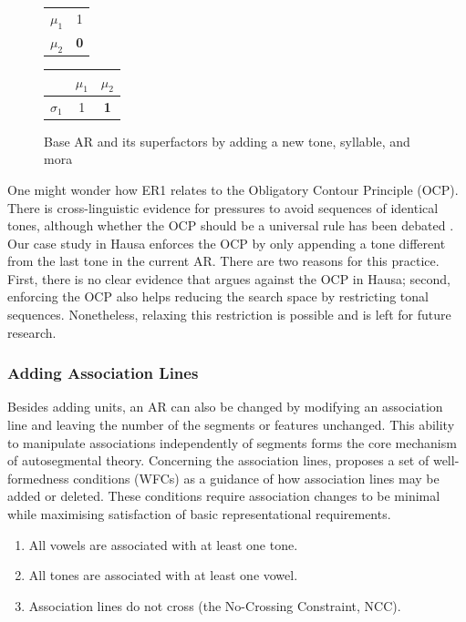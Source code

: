 \documentclass{CUP-JNL-PHO}%
\theoremstyle{definition}
\numberwithin{equation}{section}
\theoremstyle{definition}
\begin{document}
\begin{figure}[ht]
\begin{minipage}[t]{0.2\textwidth}
		\begin{tabular}{c|c}
			& \text{H} \\
			\hline
			$\mu_1$ & 1 \\
			$\mu_2$ & \textbf{0} \\
		\end{tabular}\vspace{1em}
		\begin{tabular}{c|cc}
			& $\mu_1$ & $\mu_2$ \\
			\hline
			$\sigma_1$ & 1 & \textbf{1}\\
		\end{tabular}
		\vspace{1em}
		\label{ar:sup3}
	\end{minipage}
	\hfill
	\caption{Base AR and its superfactors by adding a new tone,
		syllable, and mora}
	\label{fig.newars}
\end{figure}


One might wonder how ER1 relates to the Obligatory Contour Principle
(OCP). There is cross-linguistic evidence for pressures to avoid
sequences of identical tones, although whether the OCP should be a
universal rule has been debated \citep{goldsmith1976autosegmental,
	meyers1997ocp}. Our case study in Hausa enforces the OCP by only 
appending a tone different from the last tone in the current AR. There 
are two reasons for this practice. First, there is no clear evidence 
that argues against the OCP in Hausa; second, enforcing the OCP also 
helps reducing the search space by restricting tonal sequences. 
Nonetheless, relaxing this restriction is possible and is left 
for future research.


\subsubsection{Adding Association Lines}
Besides adding units, an AR can also be changed by modifying an 
association line and leaving the number of the segments or features 
unchanged. This ability to manipulate associations independently 
of segments forms the core mechanism of autosegmental theory. 
Concerning the association lines, \citet{goldsmith1976autosegmental} 
proposes a set of well-formedness conditions (WFCs) as a guidance 
of how association lines may be added or deleted. These conditions 
require association changes to be minimal while maximising satisfaction 
of basic representational requirements.

\begin{enumerate}
	\setlength\itemsep{0em}
	\setlength\parskip{0em}
	\item All vowels are associated with at least one tone.
	\item All tones are associated with at least one vowel.
	\item Association lines do not cross (the No-Crossing Constraint, NCC).
\end{enumerate}
\end{document}
